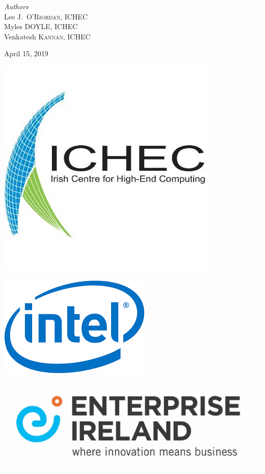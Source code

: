 \documentclass[11pt]{article}
\begin{document}
\begin{titlepage}
\vfill
\begin{center} \large
\emph{Authors}\\[0.5cm]
Lee J.~\textsc{O'Riordan}, ICHEC\\[0.2cm]
Myles \textsc{DOYLE}, ICHEC\\[0.2cm]
Venkatesh \textsc{Kannan}, ICHEC
\end{center}
\vfill
{\large April 15, 2019}\\[1cm] 
\vfill
\hfill\begin{minipage}{0.4\textwidth}
\includegraphics[scale=0.3]{ichec_logo.jpeg}
\end{minipage}
\hfill
\begin{minipage}{0.4\textwidth}
\includegraphics[scale=0.4]{intel_logo.png}
\end{minipage}
\hfill
\vfill
\includegraphics[scale=0.3]{ei_logo.JPG}
\vfill
\end{titlepage}
\end{document}
